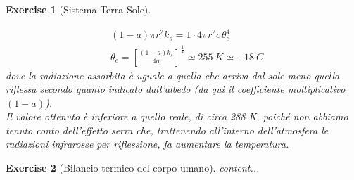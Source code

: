 \documentclass[10pt,a4paper]{article}
\newtheorem{exercise}{Exercise}
\begin{document}
\begin{exercise}[Sistema Terra-Sole]
\begin{enumerate}
\begin{align*}
		&(1-a)\pi r^2 k_s = 1\cdot 4 \pi r^2 \sigma \theta_e^4\\
		&\theta_e = \left[\frac{(1-a)k_s}{4\sigma}\right]^{\frac{1}{4}}\simeq 255\ K \simeq -18\ C
	\end{align*}
dove la radiazione assorbita è uguale a quella che arriva dal sole meno quella riflessa secondo quanto indicato dall'albedo (da qui il coefficiente moltiplicativo \((1-a)\)).\\
Il valore ottenuto è inferiore a quello reale, di circa 288 \textdegree K, poiché non abbiamo tenuto conto dell'effetto serra che, trattenendo all'interno dell'atmosfera le radiazioni infrarosse per riflessione, fa aumentare la temperatura. 
\end{enumerate}
\end{exercise}

\begin{exercise}[Bilancio termico del corpo umano]
	content...
\end{exercise}
\appendix
\end{document}
